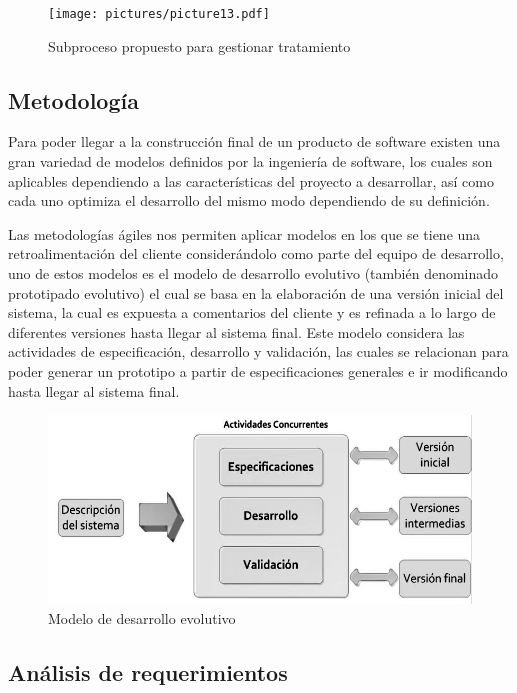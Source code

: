 \begin{figure}[H]
\centering
\centerline{\texttt{[image: pictures/picture13.pdf]}}
\caption{Subproceso propuesto para gestionar tratamiento}
\end{figure}

\newpage
\subsection{Metodología}

Para poder llegar a la construcción final de un producto de software existen una gran variedad de modelos definidos por la ingeniería de software, los cuales son aplicables dependiendo a las características del proyecto a desarrollar, así como cada uno optimiza el desarrollo del mismo modo dependiendo de su definición\cite{A01}. 

\vspace{1em}

Las metodologías ágiles nos permiten aplicar modelos en los que se tiene una retroalimentación del cliente considerándolo como parte del equipo de desarrollo, uno de estos modelos es el modelo de desarrollo evolutivo (también denominado prototipado evolutivo) el cual se basa en la elaboración de una versión inicial del sistema, la cual es expuesta a comentarios del cliente y es refinada a lo largo de diferentes versiones hasta llegar al sistema final. Este modelo considera las actividades de especificación, desarrollo y validación, las cuales se relacionan para poder generar un prototipo a partir de especificaciones generales e ir modificando hasta llegar al sistema final\cite{A07}.

\begin{figure}[H]
\centering
\centerline{\includegraphics[width=12cm, keepaspectratio]{pictures/picture14.png}}
\caption{Modelo de desarrollo evolutivo}
\end{figure}

\newpage
\subsection{Análisis de requerimientos}

